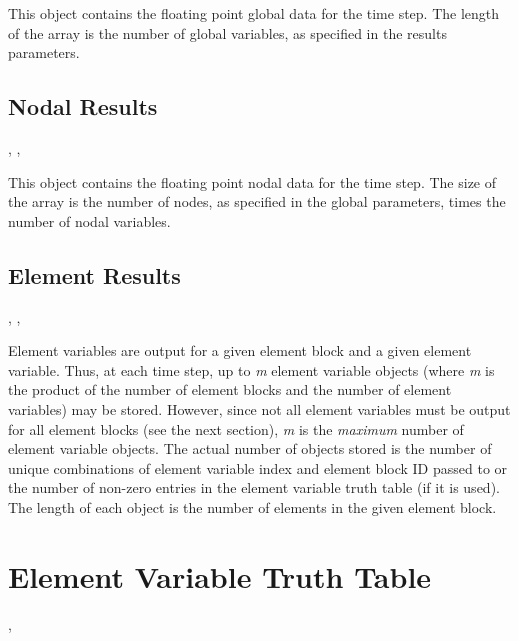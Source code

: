 This object contains the floating point global data for the time
step. The length of the array is the number of global variables, as
specified in the results parameters.


\subsection{Nodal Results}

\begin{spacing}{1.5}
\api {}, , 
\end{spacing}

This object contains the floating point nodal data for the 
time step. The size of the array is the number of nodes, as specified 
in the global parameters, times the number of nodal variables.

\subsection{Element Results}

\begin{spacing}{1.5}
\api {}, , 
\end{spacing}

Element variables are output for a given element block and a given
element variable. Thus, at each time step, up to \textit{{m}} element
variable objects (where \textit{{m}} is the product of the number of
element blocks and the number of element variables) may be
stored. However, since not all element variables must be output for
all element blocks (see the next section), \textit{{m}} is the
\textit{{maximum}} number of element variable objects. The actual
number of objects stored is the number of unique combinations of
element variable index and element block ID passed to
 or the number of non-zero entries in the
element variable truth table (if it is used). The length of each
object is the number of elements in the given element block.


\section{Element Variable Truth Table}


\begin{spacing}{1.5}
\api {}, 
\end{spacing}

